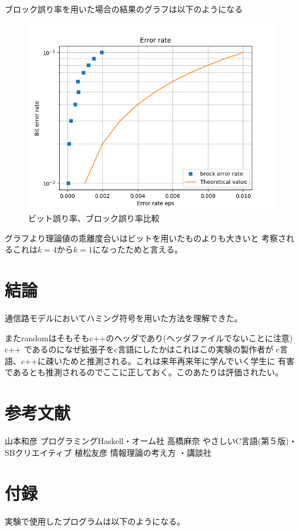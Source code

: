 \documentclass{jsarticle}
\begin{document}
ブロック誤り率を用いた場合の結果のグラフは以下のようになる
\begin{figure}[H]
  \centering
  \includegraphics[width=12cm]{./graph2.png}
  \caption{ビット誤り率、ブロック誤り率比較}
\end{figure}



グラフより理論値の乖離度合いはビットを用いたものよりも大きいと
考察されるこれは$k = 4$から$k = 1$になったためと言える。


\section{結論}
通信路モデルにおいてハミング符号を用いた方法を理解できた。

またrandomはそもそもc++のヘッダであり(ヘッダファイルでないことに注意)
c++ であるのになぜ拡張子をc言語にしたかはこれはこの実験の製作者が
c言語、c++に疎いためと推測される。これは来年再来年に学んでいく学生に
有害であるとも推測されるのでここに正しておく。このあたりは評価されたい。


\section{参考文献}
\begin{thebibliography}{9}
   山本和彦 プログラミングHaskell・オーム社
   高橋麻奈 やさしいC言語(第５版)・SBクリエイティブ
   植松友彦 情報理論の考え方 ・講談社
\end{thebibliography}

\section{付録}
実験で使用したプログラムは以下のようになる。

\end{document}

